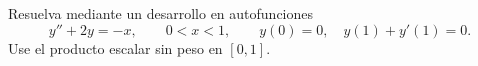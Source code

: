 Resuelva mediante un desarrollo en autofunciones
\[y''+2y=-x,\qquad0<x<1,\qquad y(0)=0,\quad y(1)+y'(1)=0.\]
Use el producto escalar sin peso en $[0,1]$.

